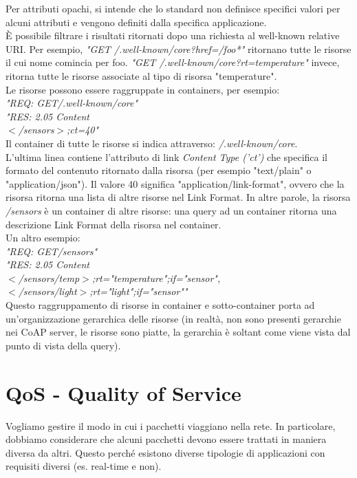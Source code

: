 \documentclass{article}
\begin{document}
Per attributi opachi, si intende che lo standard non definisce specifici valori per alcuni attributi e vengono definiti dalla specifica applicazione. \\ È possibile filtrare i risultati ritornati dopo una richiesta al well-known relative URI. Per esempio, \textit{"GET /.well-known/core?href=/foo*"} ritornano tutte le risorse il cui nome comincia per foo. \textit{"GET /.well-known/core?rt=temperature"} invece, ritorna tutte le risorse associate al tipo di risorsa "temperature". \\ Le risorse possono essere raggruppate in containers, per esempio: \\ \textit{"REQ: GET/.well-known/core" \\ "RES: 2.05 Content \\ $<$/sensors$>$;ct=40"} \\ Il container di tutte le risorse si indica attraverso: \textit{/.well-known/core}. \\ L'ultima linea contiene l'attributo di link \textit{Content Type ('ct')} che specifica il formato del contenuto ritornato dalla risorsa (per esempio "text/plain" o "application/json"). Il valore 40 significa "application/link-format", ovvero che la risorsa ritorna una lista di altre risorse nel Link Format. In altre parole, la risorsa \textit{/sensors} è un container di altre risorse: una query ad un container ritorna una descrizione Link Format della risorsa nel container. \\ 
Un altro esempio:\\ \textit{"REQ: GET/sensors" \\ "RES: 2.05 Content \\ $<$/sensors/temp$>$;rt="temperature";if="sensor", \\ $<$/sensors/light$>$;rt="light";if="sensor""} \\ 
Questo raggruppamento di risorse in container e sotto-container porta ad un'organizzazione gerarchica delle risorse (in realtà, non sono presenti gerarchie nei CoAP server, le risorse sono piatte, la gerarchia è soltant come viene vista dal punto di vista della query).

\newpage
\section{QoS - Quality of Service}
Vogliamo gestire il modo in cui i pacchetti viaggiano nella rete. In particolare, dobbiamo considerare che alcuni pacchetti devono essere trattati in maniera diversa da altri. Questo perché esistono diverse tipologie di applicazioni con requisiti diversi (es. real-time e non).
\end{document}

